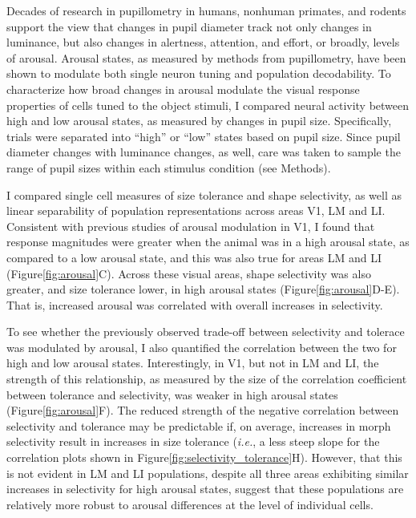 Decades of research in pupillometry in humans, nonhuman primates, and rodents support the view that changes in pupil diameter track not only changes in luminance, but also changes in alertness, attention, and effort, or broadly, levels of arousal\cite{Reimer2016, McGinley2015WakingResponses, Reimer2014, Vinck2015}. Arousal states, as measured by methods from pupillometry, have been shown to modulate both single neuron tuning and population decodability. To characterize how broad changes in arousal modulate the visual response properties of cells tuned to the object stimuli, I compared neural activity between high and low arousal states, as measured by changes in pupil size\cite{Liang2020, Stringer2019a}. Specifically, trials were separated into ``high'' or ``low'' states based on pupil size. Since pupil diameter changes with luminance changes, as well, care was taken to sample the range of pupil sizes within each stimulus condition (see Methods). 

I compared single cell measures of size tolerance and shape selectivity, as well as linear separability of population representations across areas V1, LM and LI. Consistent with previous studies of arousal modulation in V1, I found that response magnitudes were greater when the animal was in a high arousal state, as compared to a low arousal state, and this was also true for areas LM and LI (Figure\ref{fig:arousal}C). Across these visual areas, shape selectivity was also greater, and size tolerance lower, in high arousal states (Figure\ref{fig:arousal}D-E). That is, increased arousal was correlated with overall increases in selectivity.

To see whether the previously observed trade-off between selectivity and tolerace was modulated by arousal, I also quantified the correlation between the two for high and low arousal states. Interestingly, in V1, but not in LM and LI, the strength of this relationship, as measured by the size of the correlation coefficient between tolerance and selectivity, was weaker in high arousal states (Figure\ref{fig:arousal}F). The reduced strength of the negative correlation between selectivity and tolerance may be predictable if, on average, increases in morph selectivity result in increases in size tolerance (\textit{i.e.}, a less steep slope for the correlation plots shown in Figure\ref{fig:selectivity_tolerance}H). However, that this is not evident in LM and LI populations, despite all three areas exhibiting similar increases in selectivity for high arousal states, suggest that these populations are relatively more robust to arousal differences at the level of individual cells. 



